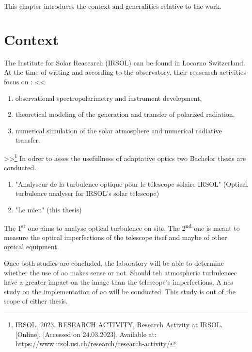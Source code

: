 This chapter introduces the context and generalities relative to the work.



\section{Context}
The Institute for Solar Reasearch (\Gls{IRSOL}) can be found in Locarno Switzerland. At the time of writing and according to the observatory, their reasearch activities focus on :
<<
\begin{enumerate}
    \item observational spectropolarimetry and instrument development,
    \item theoretical modeling of the generation and transfer of polarized radiation,
    \item numerical simulation of the solar atmosphere and numerical radiative transfer.
\end{enumerate}>>\footnote{\cite{IRSOL_research} IRSOL, 2023. RESEARCH ACTIVITY, Research Activity at IRSOL. [Online]. [Accessed on 24.03.2023]. Available at: https://www.irsol.usi.ch/research/research-activity/}
In odrer to asses the usefullness of adaptative optics two Bachelor thesis are conducted.
\begin{enumerate}
    \item "Analyseur de la turbulence optique pour le télescope solaire IRSOL" (Optical turbulence analyser for \Gls{IRSOL}'s solar telescope)
    \item "Le mien" (this thesis)
\end{enumerate}
The 1\textsuperscript{st} one aims to analyse optical turbulence on site. The 2\textsuperscript{nd} one is meant to measure the optical imperfections of the telescope itsef and maybe of other optical equipment.

Once both studies are concluded, the laboratory will be able to determine whether the use of \acrfull{ao} makes sense or not. Should teh atmospheric turbulencec have a greater impact on the image than the telescope's imperfections, A nes study on the implementation of \acrshort{ao} will be conducted. This study is out of the scope of either thesis.



